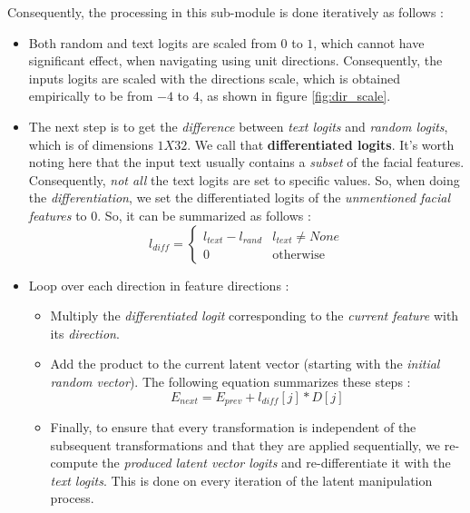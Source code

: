 Consequently, the processing in this sub-module is done iteratively as follows :
\begin{itemize}
    \item Both random and text logits are scaled from $0$ to $1$, which cannot have significant effect, when navigating using unit directions. Consequently, the inputs logits are scaled with the directions scale, which is obtained empirically to be from $-4$ to $4$, as shown in figure \ref{fig:dir_scale}.
    \item The next step is to get the \emph{difference} between \emph{text logits} and \emph{random logits}, which is of dimensions $1X32$. We call that \textbf{differentiated logits}. It's worth noting here that the input text usually contains a \emph{subset} of the facial features. Consequently, \emph{not all} the text logits are set to specific values. So, when doing the \emph{differentiation}, we set the differentiated logits of the \emph{unmentioned facial features} to $0$. So, it can be summarized as follows :
    \begin{equation}
        l_{diff}=
        \left\{ \begin{array}{ll}
            l_{text} - l_{rand} & l_{text} \neq None \\
            0 & \text{otherwise}
        \end{array} \right.
    \end{equation}
    \item Loop over each direction in feature directions :
    \begin{itemize}
        \item Multiply the \emph{differentiated logit} corresponding to the \emph{current feature} with its \emph{direction}.
        \item Add the product to the current latent vector (starting with the \emph{initial random vector}). The following equation summarizes these steps :
        \begin{equation}
            E_{next} = E_{prev} + l_{diff}[j] * D[j]
        \end{equation}
        \item Finally, to ensure that every transformation is independent of the subsequent transformations and that they are applied sequentially, we re-compute the \emph{produced latent vector logits} and re-differentiate it with the \emph{text logits}. This is done on every iteration of the latent manipulation process.
    \end{itemize}
\end{itemize}

